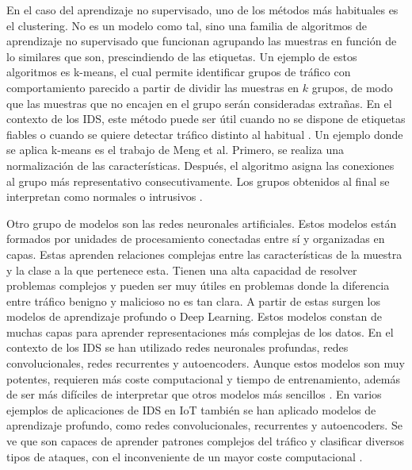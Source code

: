 En el caso del aprendizaje no supervisado, uno de los métodos más habituales es el clustering. No es un modelo como tal, sino una familia de algoritmos de aprendizaje no supervisado que funcionan agrupando las muestras en función de lo similares que son, prescindiendo de las etiquetas. Un ejemplo de estos algoritmos es k-means, el cual permite identificar grupos de tráfico con comportamiento parecido a partir de dividir las muestras en $k$ grupos, de modo que las muestras que no encajen en el grupo serán consideradas extrañas. En el contexto de los IDS, este método puede ser útil cuando no se dispone de etiquetas fiables o cuando se quiere detectar tráfico distinto al habitual \cite{wagh2013surveyids,zamani2015mlids}. Un ejemplo donde se aplica k-means es el trabajo de Meng et al. Primero, se realiza una normalización de las características. Después, el algoritmo asigna las conexiones al grupo más representativo consecutivamente. Los grupos obtenidos al final se interpretan como normales o intrusivos \cite{meng2009kmeansids}.

Otro grupo de modelos son las redes neuronales artificiales. Estos modelos están formados por unidades de procesamiento conectadas entre sí y organizadas en capas. Estas aprenden relaciones complejas entre las características de la muestra y la clase a la que pertenece esta. Tienen una alta capacidad de resolver problemas complejos y pueden ser muy útiles en problemas donde la diferencia entre tráfico benigno y malicioso no es tan clara. A partir de estas surgen los modelos de aprendizaje profundo o Deep Learning. Estos modelos constan de muchas capas para aprender representaciones más complejas de los datos. En el contexto de los IDS se han utilizado redes neuronales profundas, redes convolucionales, redes recurrentes y autoencoders. Aunque estos modelos son muy potentes, requieren más coste computacional y tiempo de entrenamiento, además de ser más difíciles de interpretar que otros modelos más sencillos \cite{wagh2013surveyids,buczak2016survey,abdulganiyu2023systematic,neupane2022xids}. En varios ejemplos de aplicaciones de IDS en IoT también se han aplicado modelos de aprendizaje profundo, como redes convolucionales, recurrentes y autoencoders. Se ve que son capaces de aprender patrones complejos del tráfico y clasificar diversos tipos de ataques, con el inconveniente de un mayor coste computacional \cite{thakkar2021reviewiotids}.